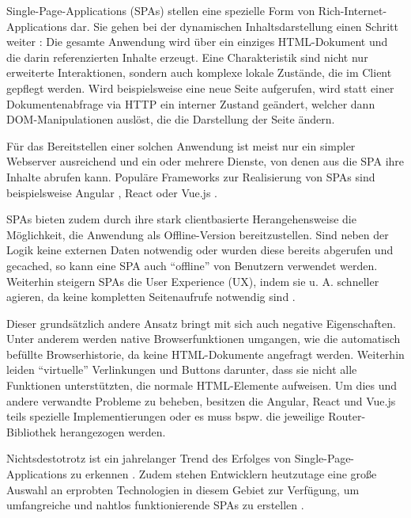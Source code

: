 Single-Page-Applications (SPAs) stellen eine spezielle Form von Rich-Internet-Applications dar. Sie gehen bei der dynamischen Inhaltsdarstellung einen Schritt weiter \cite{SinglePageApplication}: Die gesamte Anwendung wird über ein einziges HTML-Dokument und die darin referenzierten Inhalte erzeugt. Eine Charakteristik sind nicht nur erweiterte Interaktionen, sondern auch komplexe lokale Zustände, die im Client gepflegt werden. Wird beispielsweise eine neue Seite aufgerufen, wird statt einer Dokumentenabfrage via HTTP ein interner Zustand geändert, welcher dann DOM-Manipulationen auslöst, die die Darstellung der Seite ändern.

Für das Bereitstellen einer solchen Anwendung ist meist nur ein simpler Webserver ausreichend und ein oder mehrere Dienste, von denen aus die SPA ihre Inhalte abrufen kann. Populäre Frameworks zur Realisierung von SPAs sind beispielsweise Angular \cite{AngularHomepage}, React \cite{ReactHomepage} oder Vue.js \cite{VueJSHomepage}.

SPAs bieten zudem durch ihre stark clientbasierte Herangehensweise die Möglichkeit, die Anwendung als Offline-Version bereitzustellen. Sind neben der Logik keine externen Daten notwendig oder wurden diese bereits abgerufen und gecached, so kann eine SPA auch \enquote{offline} von Benutzern verwendet werden. Weiterhin steigern SPAs die User Experience (UX), indem sie u. A. schneller agieren, da keine kompletten Seitenaufrufe notwendig sind \cite{ImprovementOfAcedemicServiceBasedOnSPA}.

Dieser grundsätzlich andere Ansatz bringt mit sich auch negative Eigenschaften. Unter anderem werden native Browserfunktionen umgangen, wie die automatisch befüllte Browserhistorie, da keine  HTML-Dokumente angefragt werden. Weiterhin leiden \enquote{virtuelle} Verlinkungen und Buttons darunter, dass sie nicht alle Funktionen unterstützten, die normale HTML-Elemente aufweisen. Um dies und andere verwandte Probleme zu beheben, besitzen die Angular, React und Vue.js teils spezielle Implementierungen oder es muss bspw. die jeweilige Router-Bibliothek herangezogen werden.

Nichtsdestotrotz ist ein jahrelanger Trend des Erfolges von Single-Page-Applications zu erkennen \cite{SinglePageApplication}. Zudem stehen Entwicklern heutzutage eine große Auswahl an erprobten Technologien in diesem Gebiet zur Verfügung, um umfangreiche und nahtlos funktionierende SPAs zu erstellen \cite{TheStateOfJavaScript2020}.